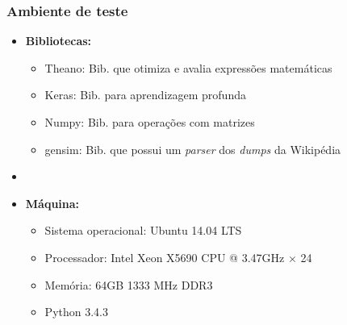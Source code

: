 \documentclass[10pt]{beamer}
\begin{document}
\begin{frame}[fragile]
  \frametitle{Ambiente de teste}

  \begin{itemize}

    \item \textbf{Bibliotecas:}
    \begin{itemize}
      \item[-] Theano: Bib. que otimiza e avalia expressões matemáticas
      \item[-] Keras: Bib. para aprendizagem profunda
      \item[-] Numpy: Bib. para operações com matrizes
      \item[-] gensim: Bib. que possui um \textit{parser} dos \textit{dumps} da Wikipédia
    \end{itemize}

    \item[\ ] \ 

    \item \textbf{Máquina:}
    \begin{itemize}
      \item[-] Sistema operacional: Ubuntu 14.04 LTS
      \item[-] Processador: Intel Xeon X5690 CPU @ 3.47GHz $\times$ 24
      \item[-] Memória: 64GB 1333 MHz DDR3
      \item[-] Python 3.4.3
    \end{itemize}

  \end{itemize}

\end{frame}
\end{document}
